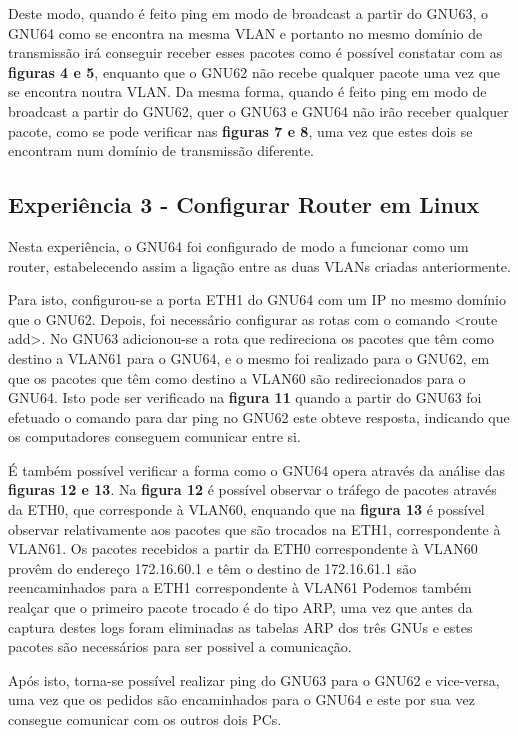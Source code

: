 \documentclass[article, a4paper, 11pt, oneside]{memoir}
\begin{document}
Deste modo, quando é feito ping em modo de broadcast a partir do GNU63, o GNU64 como se encontra na mesma VLAN e portanto no mesmo domínio de transmissão
irá conseguir 
receber esses pacotes como é possível constatar com as \textbf{figuras 4 e 5}, enquanto que o GNU62 não recebe qualquer pacote uma vez que se encontra noutra VLAN.
Da mesma forma, quando é feito ping em modo de broadcast a partir do GNU62, quer o GNU63 e GNU64 não irão receber qualquer pacote, como se pode verificar
nas \textbf{figuras 7 e 8}, uma vez que estes dois se encontram num domínio de transmissão diferente.


\subsection{Experiência 3 - Configurar Router em Linux}

Nesta experiência, o GNU64 foi configurado de modo a funcionar como um router, estabelecendo assim a ligação entre as duas VLANs criadas anteriormente.

Para isto, configurou-se a porta ETH1 do GNU64 com um IP no mesmo domínio que o GNU62. Depois, foi necessário configurar as rotas com o comando <route add>. 
No GNU63 adicionou-se a rota que redireciona os pacotes que têm como destino a VLAN61 para o GNU64, 
e o mesmo foi realizado para o GNU62, em que os pacotes que têm como destino a VLAN60 são redirecionados para o GNU64.
Isto pode ser verificado na \textbf{figura 11} quando a partir do GNU63 foi efetuado o comando para dar ping no GNU62 este obteve resposta, 
indicando que os computadores conseguem comunicar entre si.

É também possível verificar a forma como o GNU64 opera através da análise das \textbf{figuras 12 e 13}. Na \textbf{figura 12} é possível observar o tráfego de 
pacotes através da ETH0, 
que corresponde à VLAN60, enquando que na \textbf{figura 13} é possível observar relativamente aos pacotes que são trocados na ETH1, correspondente à VLAN61. 
Os pacotes recebidos a partir da
ETH0 correspondente à VLAN60 provêm do endereço 172.16.60.1 e têm o destino de 172.16.61.1 são reencaminhados para a ETH1 correspondente à VLAN61
Podemos também realçar que o primeiro pacote trocado é do tipo ARP, uma vez que antes da captura destes logs foram eliminadas as tabelas ARP dos três GNUs e estes pacotes são necessários
para ser possivel a comunicação.

Após isto, torna-se possível realizar ping do GNU63 para o GNU62 e vice-versa, uma vez que os pedidos são encaminhados para o GNU64 e este por sua vez consegue comunicar com os outros dois PCs.
\end{document}
